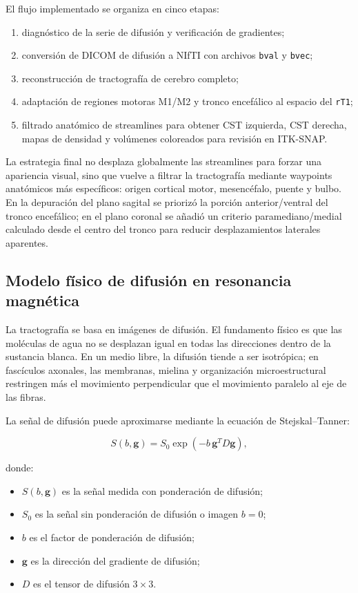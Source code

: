 \documentclass[12pt,a4paper]{article}
\begin{document}
El flujo implementado se organiza en cinco etapas:

\begin{enumerate}
    \item diagnóstico de la serie de difusión y verificación de gradientes;
    \item conversión de DICOM de difusión a NIfTI con archivos \texttt{bval} y \texttt{bvec};
    \item reconstrucción de tractografía de cerebro completo;
    \item adaptación de regiones motoras M1/M2 y tronco encefálico al espacio del \texttt{rT1};
    \item filtrado anatómico de streamlines para obtener CST izquierda, CST derecha, mapas de densidad y volúmenes coloreados para revisión en ITK-SNAP.
\end{enumerate}

La estrategia final no desplaza globalmente las streamlines para forzar una apariencia visual, sino que vuelve a filtrar la tractografía mediante waypoints anatómicos más específicos: origen cortical motor, mesencéfalo, puente y bulbo. En la depuración del plano sagital se priorizó la porción anterior/ventral del tronco encefálico; en el plano coronal se añadió un criterio paramediano/medial calculado desde el centro del tronco para reducir desplazamientos laterales aparentes.

\subsection{Modelo físico de difusión en resonancia magnética}

La tractografía se basa en imágenes de difusión. El fundamento físico es que las moléculas de agua no se desplazan igual en todas las direcciones dentro de la sustancia blanca. En un medio libre, la difusión tiende a ser isotrópica; en fascículos axonales, las membranas, mielina y organización microestructural restringen más el movimiento perpendicular que el movimiento paralelo al eje de las fibras.

La señal de difusión puede aproximarse mediante la ecuación de Stejskal--Tanner:

\[
S(b,\mathbf{g})
=
S_0\exp\left(-b\,\mathbf{g}^{T}D\mathbf{g}\right),
\]

donde:

\begin{itemize}
    \item $S(b,\mathbf{g})$ es la señal medida con ponderación de difusión;
    \item $S_0$ es la señal sin ponderación de difusión o imagen $b=0$;
    \item $b$ es el factor de ponderación de difusión;
    \item $\mathbf{g}$ es la dirección del gradiente de difusión;
    \item $D$ es el tensor de difusión $3\times3$.
\end{itemize}
\end{document}
